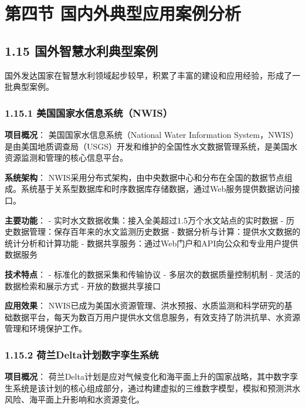 \section{第四节
国内外典型应用案例分析}\label{ux7b2cux56dbux8282-ux56fdux5185ux5916ux5178ux578bux5e94ux7528ux6848ux4f8bux5206ux6790}

\subsection{1.15
国外智慧水利典型案例}\label{ux56fdux5916ux667aux6167ux6c34ux5229ux5178ux578bux6848ux4f8b}

国外发达国家在智慧水利领域起步较早，积累了丰富的建设和应用经验，形成了一批典型案例。

\subsubsection{1.15.1
美国国家水信息系统（NWIS）}\label{ux7f8eux56fdux56fdux5bb6ux6c34ux4fe1ux606fux7cfbux7edfnwis}

\textbf{项目概况}： 美国国家水信息系统（National Water Information
System，NWIS）是由美国地质调查局（USGS）开发和维护的全国性水文数据管理系统，是美国水资源监测和管理的核心信息平台。

\textbf{系统架构}：
NWIS采用分布式架构，由中央数据中心和分布在全国的数据节点组成。系统基于关系型数据库和时序数据库存储数据，通过Web服务提供数据访问接口。

\textbf{主要功能}： -
实时水文数据收集：接入全美超过1.5万个水文站点的实时数据 -
历史数据管理：保存百年来的水文监测历史数据 -
数据分析与计算：提供水文数据的统计分析和计算功能 -
数据共享服务：通过Web门户和API向公众和专业用户提供数据服务

\textbf{技术特点}： - 标准化的数据采集和传输协议 -
多层次的数据质量控制机制 - 灵活的数据检索和展示方式 - 开放的数据共享接口

\textbf{应用效果}：
NWIS已成为美国水资源管理、洪水预报、水质监测和科学研究的基础数据平台，每天为数百万用户提供水文信息服务，有效支持了防洪抗旱、水资源管理和环境保护工作。

\subsubsection{1.15.2
荷兰Delta计划数字孪生系统}\label{ux8377ux5170deltaux8ba1ux5212ux6570ux5b57ux5b6aux751fux7cfbux7edf}

\textbf{项目概况}：
荷兰Delta计划是应对气候变化和海平面上升的国家战略，其中数字孪生系统是该计划的核心组成部分，通过构建虚拟的三维数字模型，模拟和预测洪水风险、海平面上升影响和水资源变化。

